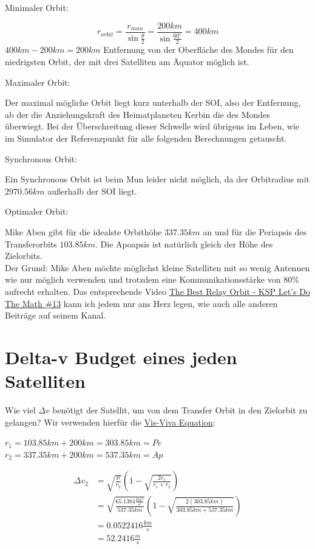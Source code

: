 \documentclass[12pt,paper=A4,numbers=noenddot,bibliography=totoc,listof=totoc,DIV=11,BCOR=1mm]{scrreprt}
\newcommand{\gq}[1]{\glqq #1\grqq} %
\begin{document}
\begin{flushleft}
Minimaler Orbit:
\end{flushleft}
\begin{equation*}
r_{orbit} = \frac{r_{mun}}{\sin \frac{\theta}{2}} = \frac{200km}{\sin \frac{60^\circ}{2}} = 400km
\end{equation*}
$400km - 200km = 200km$ Entfernung von der Oberfläche des Mondes für den niedrigsten Orbit, der mit drei Satelliten am Äquator möglich ist.

\begin{flushleft}
Maximaler Orbit:
\end{flushleft}
Der maximal mögliche Orbit liegt kurz unterhalb der SOI,
also der Entfernung, ab der die Anziehungskraft des Heimatplaneten Kerbin die des Mondes überwiegt.
Bei der Überschreitung dieser \gq{Schwelle} wird übrigens im Leben, wie im Simulator der Referenzpunkt für alle folgenden Berechnungen getauscht.

\begin{flushleft}
Synchronous Orbit:
\end{flushleft}
Ein Synchronous Orbit ist beim Mun leider nicht möglich, da der Orbitradius mit $2970.56 km$ außerhalb der SOI liegt.

\begin{flushleft}
Optimaler Orbit:
\end{flushleft}
Mike Aben gibt für die idealste Orbithöhe $337.35km$ an und für die Periapsis des Transferorbits $103.85km$. Die Apoapsis ist natürlich gleich der Höhe des Zielorbits.\\
Der Grund: Mike Aben möchte möglichst kleine Satelliten mit so wenig Antennen wie nur möglich verwenden und trotzdem eine Kommunikationsstärke von 80\% aufrecht erhalten.
Das entsprechende Video \href{https://youtu.be/gpQmvwU1x8c}{The Best Relay Orbit - KSP Let's Do The Math \#13} kann ich jedem nur ans Herz legen, wie auch alle anderen Beiträge auf seinem Kanal.

\section{Delta-v Budget eines jeden Satelliten}
Wie viel $\Delta v$ benötigt der Satellit, um von dem Transfer Orbit in den Zielorbit zu gelangen?
Wir verwenden hierfür die \hyperlink{visviva}{Vis-Viva Equation}:
\begin{flushright}
$r_{1} = 103.85km + 200km = 303.85km = Pe$ \\
$r_{2} = 337.35km + 200km = 537.35km = Ap$
\end{flushright}
\begin{equation*}
\begin{split}
\Delta v_{2} &= \sqrt{\frac{\mu}{r_{2}}} \left( 1-\sqrt{\frac{2r_{1}}{r_{1}+r_{2}}} \right) \\
             &= \sqrt{\frac{65.1384 \frac{km^{3}}{s^{2}}}{537.35km}} \left( 1-\sqrt{\frac{2(303.85km)}{303.85km+537.35km}} \right) \\
             &= 0.0522416\frac{km}{s} \\
             &= 52.2416\frac{m}{s}
\end{split}
\end{equation*}
\end{document}
